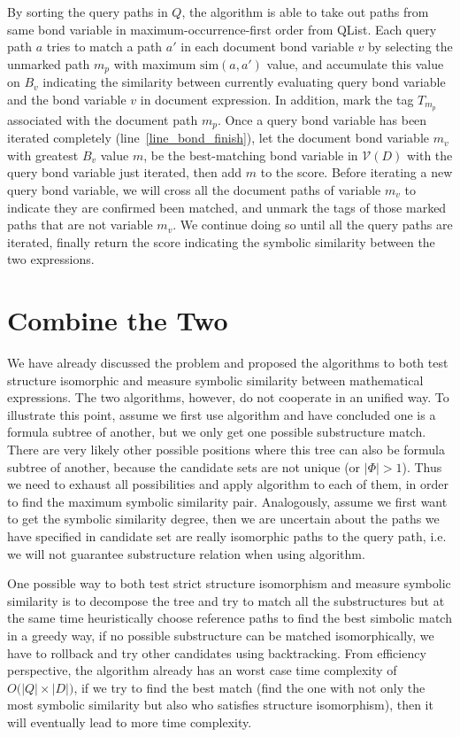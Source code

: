 By sorting the query paths in $Q$, the algorithm is able to take out paths from same bond variable in maximum-occurrence-first order from QList. 
Each query path $a$ tries to match a path $a'$ in each document bond variable $v$ by selecting the unmarked path $m_p$ with maximum $\mathrm{sim}(a,a')$ value, and accumulate this value on $B_v$ indicating the similarity between currently evaluating query bond variable and the bond variable $v$ in document expression.
In addition, mark the tag $T_{m_p}$ associated with the document path $m_p$.
Once a query bond variable has been iterated completely (line~\ref{line_bond_finish}),
let the document bond variable $m_v$ with greatest $B_v$ value $m$, be the best-matching bond variable in $\mathcal{V}(D)$ with the query bond variable just iterated, then add $m$ to the score.
Before iterating a new query bond variable, we will cross all the document paths of variable $m_v$ to indicate they are confirmed been matched, 
and unmark the tags of those marked paths that are not variable $m_v$.
We continue doing so until all the query paths are iterated, finally return the score indicating the symbolic similarity between the two expressions.

\section{Combine the Two}
We have already discussed the problem and proposed the algorithms to both test structure isomorphic and measure symbolic similarity between mathematical expressions. The two algorithms, however, do not cooperate in an unified way. 
To illustrate this point, assume we first use  algorithm and have concluded one is a formula subtree of another, but we only get one possible substructure match. 
There are very likely other possible positions where this tree can also be formula subtree of another, because the candidate sets are not unique (or $|\Phi| > 1$). 
Thus we need to exhaust all possibilities and apply  algorithm to each of them, in order to find the maximum symbolic similarity pair. 
Analogously, assume we first want to get the symbolic similarity degree, then we are uncertain about the paths we have specified in candidate set are really isomorphic paths to the query path, i.e. we will not guarantee substructure relation when using  algorithm.

One possible way to both test strict structure isomorphism and measure symbolic similarity is to decompose the tree and try to match all the substructures but at the same time heuristically choose reference paths to find the best simbolic match in a greedy way, if no possible substructure can be matched isomorphically, we have to rollback and try other candidates using backtracking.
From efficiency perspective, the  algorithm already has an worst case time complexity of $O\big(|Q| \times |D|\big)$, if we try to find the best match (find the one with not only the most symbolic similarity but also who satisfies structure isomorphism), then it will eventually lead to more time complexity.

